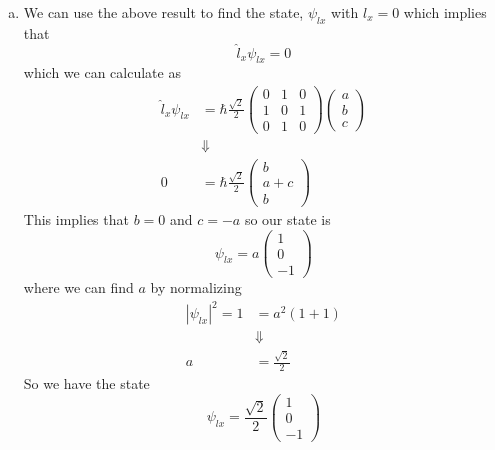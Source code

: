 \documentclass[11pt]{article}
\numberwithin{equation}{section}
\begin{document}
\begin{enumerate}[(a)]
$$\begin{array}{ccc}
              0        &1     &0
              \end{array}\right)$$
Which allows us to calculate the ladder operators by definition
\begin{align*}
\hat{l}_{+} &= \hbar\sqrt{2}\left(\begin{array}{ccc}
              0        &0     &0\\
              1        &0     &0\\
              0        &1     &0
              \end{array}\right)\\
\hat{l}_{-} &= \hbar\sqrt{2}\left(\begin{array}{ccc}
              0        &1     &0\\
              0        &0     &1\\
              0        &0     &0
              \end{array}\right)
\end{align*}

\item We can use the above result to find the state, $\psi_{lx}$ with $l_x=0$ which implies that
$$\hat{l}_x\psi_{lx} = 0$$
which we can calculate as
\begin{align*}
\hat{l}_x\psi_{lx} &= \hbar\frac{\sqrt{2}}{2}\left(\begin{array}{ccc}
              0        &1     &0\\
              1        &0     &1\\
              0        &1     &0
              \end{array}\right)
              \left(\begin{array}{c}a\\b\\c\end{array}\right)\\
&\Downarrow\\
0 &= \hbar\frac{\sqrt{2}}{2}\left(\begin{array}{c}b\\a+c\\b\end{array}\right)
\end{align*}
This implies that $b=0$ and $c=-a$ so our state is 
$$\psi_{lx} = a\left(\begin{array}{c}1\\0\\-1\end{array}\right)$$
where we can find $a$ by normalizing 
\begin{align*}
|\psi_{lx}|^2 = 1 &= a^2(1+1)\\
&\Downarrow\\
a &= \frac{\sqrt{2}}{2}
\end{align*}
So we have the state
$$\psi_{lx} = \frac{\sqrt{2}}{2}\left(\begin{array}{c}1\\0\\-1\end{array}\right)$$
\end{enumerate}
\end{document}
